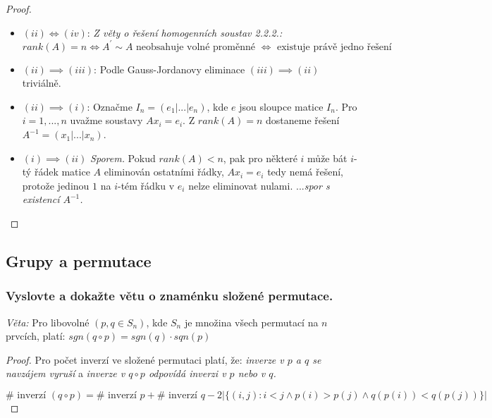 \documentclass[10pt,a4paper]{article}
\begin{document}
\begin{proof}
$ $


\begin{itemize}
    \item $(ii) \iff (iv)$: \textit{Z věty o řešení homogenních soustav 2.2.2.:} 
\begin{equation*}
rank(A) = n \iff A^\prime \sim A \text{ neobsahuje volné proměnné } \iff  \text{ existuje právě jedno řešení }
\end{equation*}
\item $(ii) \implies (iii)$:
Podle Gauss-Jordanovy eliminace $(iii) \implies (ii)$ triviálně.

\item $(ii) \implies (i)$:
    Označme $I_n = (e_1| ... |e_n)$, kde $e$ jsou sloupce matice $I_n$. Pro $i = 1, ..., n$ uvažme soustavy $Ax_i = e_i$. Z $rank(A) = n$ dostaneme řešení $A^{-1} = (x_1 | ... | x_n)$.
\item $(i) \implies (ii)$
    \textit{Sporem.} Pokud $rank(A) < n$, pak pro některé $i$ může bát $i$-tý řádek matice $A$ eliminován ostatními řádky, $Ax_i = e_i$ tedy nemá řešení, protože jedinou $1$ na $i$-tém řádku v $e_i$ nelze eliminovat nulami. $...$\textit{spor s existencí $A^{-1}$.}


\end{itemize}
\end{proof}

\newpage
\subsection{Grupy a permutace}
\subsubsection{Vyslovte a dokažte větu o znaménku složené permutace.}

\textit{Věta:} Pro libovolné $(p, q \in S_n)$, kde $S_n$ je množina všech permutací na $n$ prvcích, platí:
$sgn(q \circ p) = sgn(q) \cdot sqn(p)$

\begin{proof} 
Pro počet inverzí ve složené permutaci platí, že: \textit{inverze v $p$ a $q$ se navzájem vyruší} a \textit{inverze v $q \circ p$ odpovídá inverzi v $p$ nebo v $q$.}

\begin{equation*}
\# \text{ inverzí } (q \circ p) = \# \text{ inverzí } p + \# \text{ inverzí } q - 2|\{(i,j): i < j \land p(i) > p(j) \land q(p(i)) < q(p(j)) \}|
\end{equation*}



\end{proof}
\end{document}
